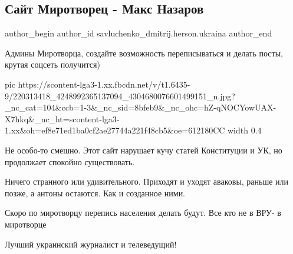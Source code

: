  
 
 
 
 
 
\subsection{Сайт Миротворец - Макс Назаров}
\label{sec:23_07_2021.fb.savluchenko_dmitrij.herson.ukraina.1.sajt_mirotvorec_maks_nazarov}
 
\ifcmt
 author_begin
   author_id savluchenko_dmitrij.herson.ukraina
 author_end
\fi

Админы Миротворца, создайте возможность переписываться и делать посты, крутая
соцсеть получится)

\ifcmt
  pic https://scontent-lga3-1.xx.fbcdn.net/v/t1.6435-9/220313418_4248992365137094_4304680076601499151_n.jpg?_nc_cat=104&ccb=1-3&_nc_sid=8bfeb9&_nc_ohc=hZ-qNOCYowUAX-X7hkq&_nc_ht=scontent-lga3-1.xx&oh=ef8e71ed1ba0cf2ae27744a221f48cb5&oe=612180CC
  width 0.4
\fi

\begin{itemize}
 
Не особо-то смешно. Этот сайт нарушает кучу статей Конституции и УК, но продолжает спокойно существовать.

 
Ничего странного или удивительного. Приходят и уходят аваковы, раньше или позже, а антоны остаются. Как и созданное ними.
 
Скоро по миротворцу перепись населения делать будут. Все кто не в ВРУ- в миротворце
 
Лучший украинский журналист и телеведущий!
\end{itemize}

